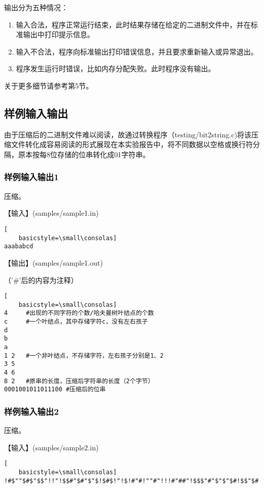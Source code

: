 \documentclass{article}
\begin{document}
输出分为五种情况：

\begin{enumerate}
    \item 输入合法，程序正常运行结束，此时结果存储在给定的二进制文件中，并在标准输出中打印提示信息。
    \item 输入不合法，程序向标准输出打印错误信息，并且要求重新输入或异常退出。
    \item 程序发生运行时错误，比如内存分配失败。此时程序没有输出。
\end{enumerate}

关于更多细节请参考第5节。

\subsection{样例输入输出}

由于压缩后的二进制文件难以阅读，故通过转换程序（testing/bit2string.c)将该压缩文件转化成容易阅读的形式展现在本实验报告中，将不同数据以空格或换行符分隔，原本按每8位存储的位串转化成01字符串。

\subsubsection{样例输入输出1}

压缩。

【输入】(samples/sample1.in)

\begin{lstlisting}[
    basicstyle=\small\consolas]
aaababcd
\end{lstlisting}

【输出】(samples/sample1.out)

（'\#'后的内容为注释）

\begin{lstlisting}[
    basicstyle=\small\consolas]
4     #出现的不同字符的个数/哈夫曼树叶结点的个数
c     #一个叶结点，其中存储字符c，没有左右孩子 
d
b
a
1 2   #一个非叶结点，不存储字符，左右孩子分别是1、2
3 5
4 6
8 2   #原串的长度，压缩后字符串的长度（2个字节）
0001001011011100 #压缩后的位串
\end{lstlisting}

\subsubsection{样例输入输出2}

压缩。

【输入】(samples/sample2.in)

\begin{lstlisting}[
    basicstyle=\small\consolas]
!#$""$#$"$$"!!"!$$#"$#"$"$!$#$!"!$!#"#!""#"!!!#"##"!$$$"#"$"$"$#!$$"$#!"#$##!!"#"#!!##!#$"!""$!"!#$$
\end{lstlisting}
\end{document}
